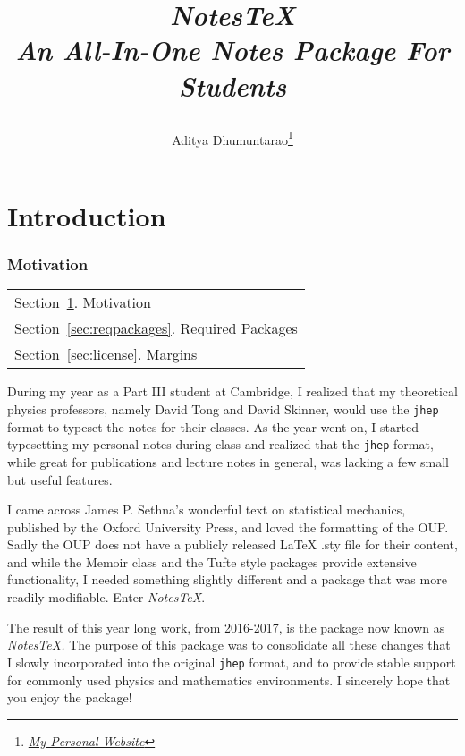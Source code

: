 \documentclass[10pt]{article}
\title{\begin{center}{\Huge \textit{NotesTeX}}\\{{\itshape An All-In-One Notes Package For Students}}\end{center}}
\author{Aditya Dhumuntarao\footnote{\href{https://geodesick.com/}{\textit{My Personal Website}}}}
\affiliation{
DAMTP, University of Cambridge\\
Perimeter Institute of Theoretical Physics\\
University of Minnesota
}
\begin{document}
	\maketitle
	\flushbottom
	\newpage
	\pagestyle{fancynotes}
	\part{Introduction}	
	\section{Motivation}\label{sec:motivation}
	\begin{margintable}\vspace{.8in}\footnotesize
		\begin{tabularx}{\marginparwidth}{|X}
		Section~\ref{sec:motivation}. Motivation\\
		Section~\ref{sec:reqpackages}. Required Packages\\
		Section~\ref{sec:license}. Margins\\
		\end{tabularx}
	\end{margintable}
	During my year as a Part III student at Cambridge, I realized that my theoretical physics professors, namely David Tong and David Skinner, would use the \texttt{jhep} format to typeset the notes for their classes. As the year went on, I started typesetting my personal notes during class and realized that the \texttt{jhep} format, while great for publications and lecture notes in general, was lacking a few small but useful features.

	I came across James P. Sethna's wonderful text on statistical mechanics, published by the Oxford University Press, and loved the formatting of the OUP. Sadly the OUP does not have a publicly released LaTeX .sty file for their content, and while the Memoir class and the Tufte style packages provide extensive functionality, I needed something slightly different and a package that was more readily modifiable. Enter \textit{NotesTeX}.

	The result of this year long work, from 2016-2017, is the package now known as \textit{NotesTeX.} The purpose of this package was to consolidate all these changes that I slowly incorporated into the original \texttt{jhep} format, and to provide stable support for commonly used physics and mathematics environments. I sincerely hope that you enjoy the package!
\end{document}
